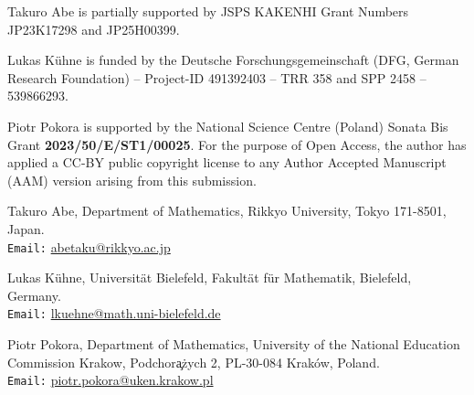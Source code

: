 \documentclass[a4paper,11pt]{amsart}
\numberwithin{equation}{section}
\theoremstyle{remark}
\begin{document}
Takuro Abe is partially supported by JSPS KAKENHI Grant Numbers JP23K17298 and JP25H00399.

Lukas K\"uhne is funded by the Deutsche Forschungsgemeinschaft (DFG, German Research Foundation) – Project-ID 491392403 – TRR 358 and SPP 2458 -- 539866293.

Piotr Pokora is supported by the National Science Centre (Poland) Sonata Bis Grant \textbf{2023/50/E/ST1/00025}. For the purpose of Open Access, the author has applied a CC-BY public copyright license to any Author Accepted Manuscript (AAM) version arising from this submission.

\printbibliography

Takuro Abe,
Department of Mathematics, 
Rikkyo University,
Tokyo 171-8501, Japan.\\
\texttt{Email:} \url{abetaku@rikkyo.ac.jp}
\bigskip

Lukas K\"uhne,
Universit\"at Bielefeld, Fakult\"at f\"ur Mathematik, Bielefeld, Germany.\\
\texttt{Email:} \url{lkuehne@math.uni-bielefeld.de}

\bigskip
Piotr Pokora,
Department of Mathematics,
University of the National Education Commission Krakow,
Podchor\c a\.zych 2,
PL-30-084 Krak\'ow, Poland. \\
\texttt{Email:} \url{piotr.pokora@uken.krakow.pl}
\end{document}

